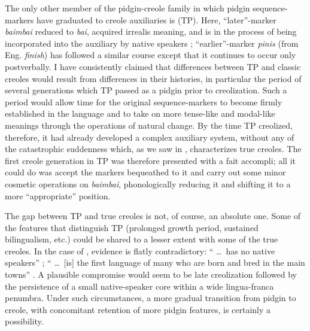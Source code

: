 The only other member of the pidgin-creole family in which pidgin sequence-markers have graduated to creole auxiliaries is  (TP). Here, ``later''-marker \textit{baimbai} reduced to \textit{bai}, acquired irrealis meaning, and is in the process of being incorporated into the auxiliary by native speakers \citep{SankoffEtAl1974}; ``earlier''-marker \textit{pinis} (from Eng. \textit{finish}) has followed a similar course except that it continues to occur only postverbally. I have consistently claimed that differences between TP and classic creoles would result from differences in their histories, in particular the period of several genera\-tions which TP passed as a pidgin prior to creolization. Such a period would allow time for the original sequence-markers to become firmly established in the language and to take on more tense-like and modal-like meanings through the operations of natural change. By the time TP creolized, therefore, it had already developed a complex auxiliary system, without any of the catastrophic suddenness which, as we saw
in , characterizes true creoles. The first creole generation in TP was therefore presented with a fait accompli; all it could do was accept the markers bequeathed to it and carry out some minor cosmetic operations on \textit{baimbai}, phonologically reducing it and shifting it to a more ``appropriate'' position.

The gap between TP and true creoles is not, of course, an abso\-lute one. Some of the features that distinguish TP (prolonged growth period, sustained bilingualism, etc.) could be shared to a lesser extent with some of the true creoles. In the case of , evidence is flatly contradictory: `` \ldots~has no native speakers'' \citep{Alleyne1979}; `` \ldots~[is] the first language of many who are born and bred in the main towns'' \citep[vii]{Wilson1962}. A plausible compromise would seem to be late creolization followed by the persistence of a small native-speaker core within a wide lingua-franca penumbra. Under such circumstances, a more gradual transition from pidgin to creole, with concomitant retention of more pidgin features, is certainly a possibility. 

